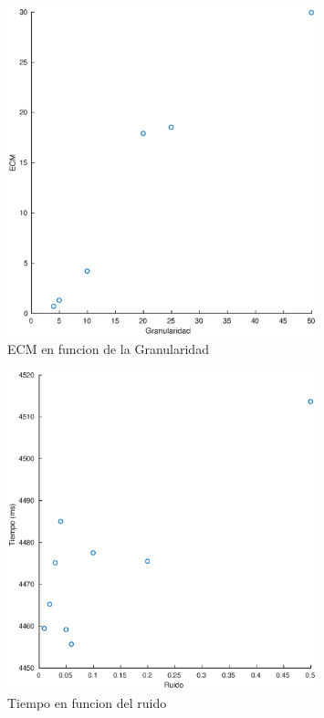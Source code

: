 \begin{figure}[H]
	\centering	\includegraphics[width=0.8\textwidth]{img/granu_ecm}
	\caption{ECM en funcion de la Granularidad}
	\label{fig:granu_ecm}
\end{figure}

\begin{figure}[H]
	\centering	\includegraphics[width=0.8\textwidth]{img/ruido_tiempo}
	\caption{Tiempo en funcion del ruido}
	\label{fig:ruido_tiempo}
\end{figure}


